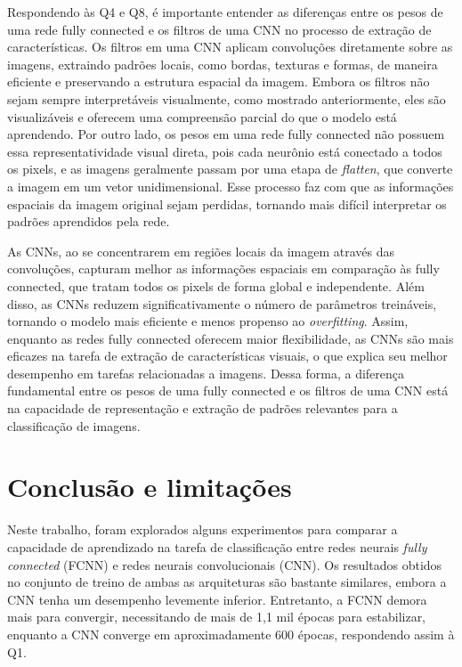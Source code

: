 \documentclass[12pt]{article}
\begin{document}
  Respondendo às Q4 e Q8, é importante entender as diferenças entre os pesos de uma rede fully connected e os filtros de uma CNN no processo de extração de características. Os filtros em uma CNN aplicam convoluções diretamente sobre as imagens, extraindo padrões locais, como bordas, texturas e formas, de maneira eficiente e preservando a estrutura espacial da imagem. Embora os filtros não sejam sempre interpretáveis visualmente, como mostrado anteriormente, eles são visualizáveis e oferecem uma compreensão parcial do que o modelo está aprendendo. Por outro lado, os pesos em uma rede fully connected não possuem essa representatividade visual direta, pois cada neurônio está conectado a todos os pixels, e as imagens geralmente passam por uma etapa de \textit{flatten}, que converte a imagem em um vetor unidimensional. Esse processo faz com que as informações espaciais da imagem original sejam perdidas, tornando mais difícil interpretar os padrões aprendidos pela rede.

  As CNNs, ao se concentrarem em regiões locais da imagem através das convoluções, capturam melhor as informações espaciais em comparação às fully connected, que tratam todos os pixels de forma global e independente. Além disso, as CNNs reduzem significativamente o número de parâmetros treináveis, tornando o modelo mais eficiente e menos propenso ao \textit{overfitting}. Assim, enquanto as redes fully connected oferecem maior flexibilidade, as CNNs são mais eficazes na tarefa de extração de características visuais, o que explica seu melhor desempenho em tarefas relacionadas a imagens. Dessa forma, a diferença fundamental entre os pesos de uma fully connected e os filtros de uma CNN está na capacidade de representação e extração de padrões relevantes para a classificação de imagens.

\section{Conclusão e limitações}

Neste trabalho, foram explorados alguns experimentos para comparar a capacidade de aprendizado na tarefa de classificação entre redes neurais \textit{fully connected} (FCNN) e redes neurais convolucionais (CNN). Os resultados obtidos no conjunto de treino de ambas as arquiteturas são bastante similares, embora a CNN tenha um desempenho levemente inferior. Entretanto, a FCNN demora mais para convergir, necessitando de mais de 1,1 mil épocas para estabilizar, enquanto a CNN converge em aproximadamente 600 épocas, respondendo assim à Q1.
\end{document}
